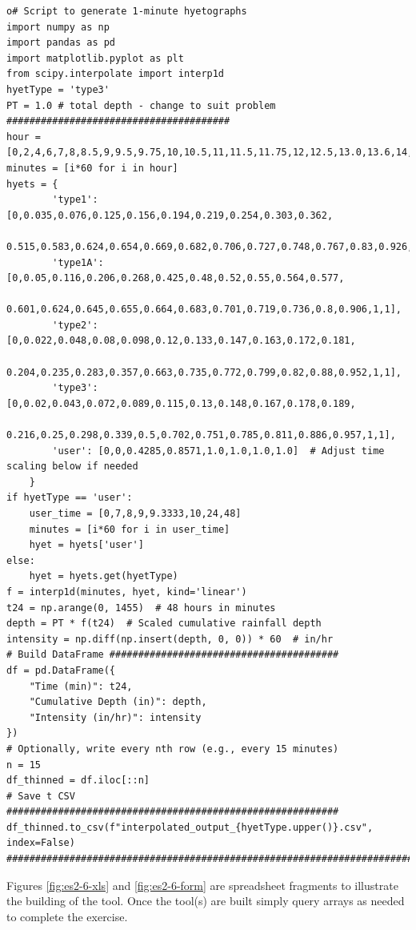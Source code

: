 \documentclass[12pt]{article}
\begin{document}
\begin{enumerate}
\begin{verbatim}o# Script to generate 1-minute hyetographs
import numpy as np
import pandas as pd
import matplotlib.pyplot as plt
from scipy.interpolate import interp1d
hyetType = 'type3'
PT = 1.0 # total depth - change to suit problem
#######################################
hour = [0,2,4,6,7,8,8.5,9,9.5,9.75,10,10.5,11,11.5,11.75,12,12.5,13.0,13.6,14,16,20,24,48]
minutes = [i*60 for i in hour]
hyets = {
        'type1': [0,0.035,0.076,0.125,0.156,0.194,0.219,0.254,0.303,0.362,
        0.515,0.583,0.624,0.654,0.669,0.682,0.706,0.727,0.748,0.767,0.83,0.926,1,1],
        'type1A': [0,0.05,0.116,0.206,0.268,0.425,0.48,0.52,0.55,0.564,0.577,
        0.601,0.624,0.645,0.655,0.664,0.683,0.701,0.719,0.736,0.8,0.906,1,1],
        'type2': [0,0.022,0.048,0.08,0.098,0.12,0.133,0.147,0.163,0.172,0.181,
        0.204,0.235,0.283,0.357,0.663,0.735,0.772,0.799,0.82,0.88,0.952,1,1],
        'type3': [0,0.02,0.043,0.072,0.089,0.115,0.13,0.148,0.167,0.178,0.189,
        0.216,0.25,0.298,0.339,0.5,0.702,0.751,0.785,0.811,0.886,0.957,1,1],
        'user': [0,0,0.4285,0.8571,1.0,1.0,1.0,1.0]  # Adjust time scaling below if needed
    }
if hyetType == 'user':
    user_time = [0,7,8,9,9.3333,10,24,48]
    minutes = [i*60 for i in user_time]
    hyet = hyets['user']
else:
    hyet = hyets.get(hyetType)
f = interp1d(minutes, hyet, kind='linear')
t24 = np.arange(0, 1455)  # 48 hours in minutes
depth = PT * f(t24)  # Scaled cumulative rainfall depth
intensity = np.diff(np.insert(depth, 0, 0)) * 60  # in/hr
# Build DataFrame ########################################
df = pd.DataFrame({
    "Time (min)": t24,
    "Cumulative Depth (in)": depth,
    "Intensity (in/hr)": intensity
})
# Optionally, write every nth row (e.g., every 15 minutes)
n = 15
df_thinned = df.iloc[::n]
# Save t CSV ##########################################################
df_thinned.to_csv(f"interpolated_output_{hyetType.upper()}.csv", index=False)
##########################################################################
\end{verbatim}

Figures \ref{fig:es2-6-xls} and \ref{fig:es2-6-form} are spreadsheet fragments to illustrate the building of the tool. Once the tool(s) are built simply query arrays as needed to complete the exercise.


\end{enumerate}
\end{document}
